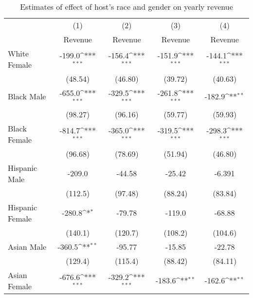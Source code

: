 {
\def\sym#1{\ifmmode^{#1}\else\(^{#1}\)\fi}
\begin{longtable}{l*{4}{c}}
\caption{Estimates of effect of host's race and gender on yearly revenue}\\
\hline\hline\endfirsthead\hline\endhead\hline\endfoot\endlastfoot
                    &\multicolumn{1}{c}{(1)}&\multicolumn{1}{c}{(2)}&\multicolumn{1}{c}{(3)}&\multicolumn{1}{c}{(4)}\\
                    &\multicolumn{1}{c}{Revenue}&\multicolumn{1}{c}{Revenue}&\multicolumn{1}{c}{Revenue}&\multicolumn{1}{c}{Revenue}\\
\hline
White Female        &      -199.0\sym{***}&      -156.4\sym{***}&      -151.9\sym{***}&      -144.1\sym{***}\\
                    &     (48.54)         &     (46.80)         &     (39.72)         &     (40.63)         \\
[1em]
Black Male          &      -655.0\sym{***}&      -329.5\sym{***}&      -261.8\sym{***}&      -182.9\sym{**} \\
                    &     (98.27)         &     (96.16)         &     (59.77)         &     (59.93)         \\
[1em]
Black Female        &      -814.7\sym{***}&      -365.0\sym{***}&      -319.5\sym{***}&      -298.3\sym{***}\\
                    &     (96.68)         &     (78.69)         &     (51.94)         &     (46.80)         \\
[1em]
Hispanic Male       &      -209.0         &      -44.58         &      -25.42         &      -6.391         \\
                    &     (112.5)         &     (97.48)         &     (88.24)         &     (83.84)         \\
[1em]
Hispanic Female     &      -280.8\sym{*}  &      -79.78         &      -119.0         &      -68.88         \\
                    &     (140.1)         &     (120.7)         &     (108.2)         &     (104.6)         \\
[1em]
Asian Male          &      -360.5\sym{**} &      -95.77         &      -15.85         &      -22.78         \\
                    &     (129.4)         &     (115.4)         &     (88.42)         &     (84.11)         \\
[1em]
Asian Female        &      -676.6\sym{***}&      -329.2\sym{***}&      -183.6\sym{**} &      -162.6\sym{**} \\

\end{longtable}}
